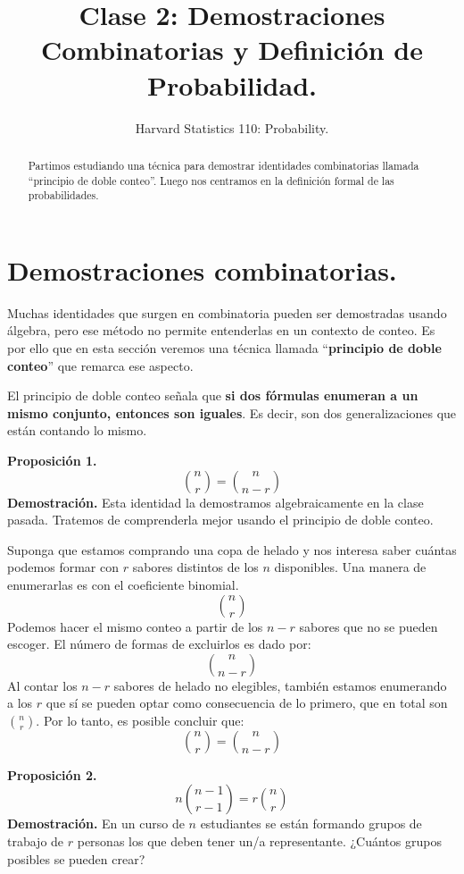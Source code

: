 \documentclass[12pt]{article}
\title{Clase 2: Demostraciones Combinatorias y Definición de Probabilidad.}
\author{Harvard Statistics 110: Probability.}
\date{}
\begin{document}
\maketitle

\begin{abstract}
\noindent Partimos estudiando una técnica para demostrar identidades combinatorias llamada ``principio de doble conteo''. Luego nos centramos en la definición formal de las probabilidades.
\end{abstract}


\section{Demostraciones combinatorias.}

Muchas identidades que surgen en combinatoria pueden ser demostradas usando álgebra, pero ese método no permite entenderlas en un contexto de conteo. Es por ello que en esta sección veremos una técnica llamada ``\textbf{principio de doble conteo}'' que remarca ese aspecto.

El principio de doble conteo señala que \textbf{si dos fórmulas enumeran a un mismo conjunto, entonces son iguales}. Es decir, son dos generalizaciones que están contando lo mismo.

\textbf{Proposición 1.}
\[
  \binom{n}{r} = \binom{n}{n - r}
\]
\textbf{Demostración.} Esta identidad la demostramos algebraicamente en la clase pasada. Tratemos de comprenderla mejor usando el principio de doble conteo.

Suponga que estamos comprando una copa de helado y nos interesa saber cuántas podemos formar con $r$ sabores distintos de los $n$ disponibles. Una manera de enumerarlas es con el coeficiente binomial.
\[
  \binom{n}{r}
\]
Podemos hacer el mismo conteo a partir de los $n - r$ sabores que no se pueden escoger. El número de formas de excluirlos es dado por:
\[
  \binom{n}{n - r}
\]
Al contar los $n - r$ sabores de helado no elegibles, también estamos enumerando a los $r$ que sí se pueden optar como consecuencia de lo primero, que en total son $\binom{n}{r}$. Por lo tanto, es posible concluir que:
\[
  \binom{n}{r} = \binom{n}{n - r}
\]

\textbf{Proposición 2.}
\[
  n \binom{n - 1}{r - 1} = r \binom{n}{r}
\]
\textbf{Demostración.} En un curso de $n$ estudiantes se están formando grupos de trabajo de $r$ personas los que deben tener un/a representante. ¿Cuántos grupos posibles se pueden crear?
\end{document}
